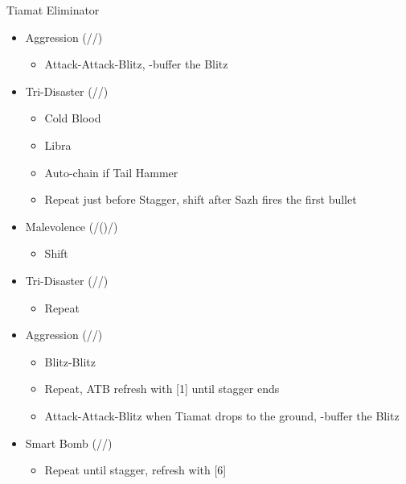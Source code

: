\begin{multicols}{2}
\begin{menu}
  \end{menu}
  \renewcommand{\first}{[1] Tireless Charge ((\com)/\com/\med)}
  \renewcommand{\second}{[2] Aggression (\com/\com/\rav)}
  \renewcommand{\third}{[3] Consolidation (\sen/\sen/\med)}
  \renewcommand{\fourth}{[4] Malevolence (\syn/(\rav)/\rav)}
  \renewcommand{\fifth}{[5] Smart Bomb (\rav/\rav/\sab)}
  \renewcommand{\sixth}{[6] Tri-Disaster (\rav/\rav/\rav)}
  \begin{battle}[1:55]{Tiamat Eliminator}
    \begin{itemize}
      \item \second
            \begin{itemize}
              \item Attack-Attack-Blitz, \rav-buffer the Blitz
            \end{itemize}
      \item \sixth
            \begin{itemize}
              \item Cold Blood
              \item Libra
              \item Auto-chain if Tail Hammer
              \item Repeat just before Stagger, shift after Sazh fires the first bullet
            \end{itemize}
      \item \fourth
            \begin{itemize}
              \item Shift
            \end{itemize}
      \item \sixth
            \begin{itemize}
              \item Repeat
            \end{itemize}
      \item \second
            \begin{itemize}
              \item Blitz-Blitz
              \item Repeat, ATB refresh with [1] until stagger ends
              \item Attack-Attack-Blitz when Tiamat drops to the ground, \rav-buffer the Blitz
            \end{itemize}
      \item \fifth
            \begin{itemize}
              \item Repeat until stagger, refresh with [6]

\end{itemize}
\end{itemize}
\end{battle}
\end{multicols}

